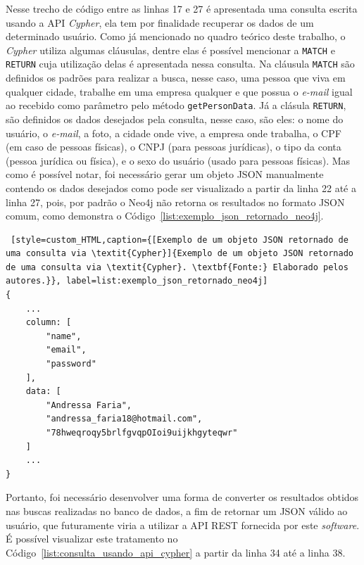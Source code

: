 
Nesse trecho de código entre as linhas 17 e 27 é apresentada uma consulta escrita usando a API \textit{Cypher}, ela tem por finalidade recuperar os dados de um determinado usuário. Como já mencionado no quadro teórico deste trabalho, o \textit{Cypher} utiliza algumas cláusulas, dentre elas é possível mencionar a \texttt{MATCH} e \texttt{RETURN} cuja utilização delas é apresentada nessa consulta. Na cláusula \texttt{MATCH} são definidos os padrões para realizar a busca, nesse caso, uma pessoa que viva em qualquer cidade, trabalhe em uma empresa qualquer e que possua o \textit{e-mail} igual ao recebido como parâmetro pelo método \texttt{getPersonData}. Já a clásula \texttt{RETURN}, são definidos os dados desejados pela consulta, nesse caso, são eles: o nome do usuário, o \textit{e-mail}, a foto, a cidade onde vive, a empresa onde trabalha, o CPF (em caso de pessoas físicas), o CNPJ (para pessoas jurídicas), o tipo da conta (pessoa jurídica ou física), e o sexo do usuário (usado para pessoas físicas). Mas como é possível notar, foi necessário gerar um objeto JSON manualmente contendo os dados desejados como pode ser visualizado a partir da linha 22 até a linha 27, pois, por padrão o Neo4j não retorna os resultados no formato JSON comum, como demonstra o Código~\ref{list:exemplo_json_retornado_neo4j}. 

\begin{lstlisting} [style=custom_HTML,caption={[Exemplo de um objeto JSON retornado de uma consulta via \textit{Cypher}]{Exemplo de um objeto JSON retornado de uma consulta via \textit{Cypher}. \textbf{Fonte:} Elaborado pelos autores.}}, label=list:exemplo_json_retornado_neo4j] 	
{
	...
	column: [
		"name",
		"email",
		"password"
	],
	data: [
		"Andressa Faria",
		"andressa_faria18@hotmail.com",
		"78hweqroqy5brlfgvqpOIoi9uijkhgyteqwr"
	]
	...
}
\end{lstlisting}

Portanto, foi necessário desenvolver uma forma de converter os resultados obtidos nas buscas realizadas no banco de dados, a fim de retornar um JSON válido ao usuário, que futuramente viria a utilizar a API REST fornecida por este \textit{software}. É possível visualizar este tratamento no Código~\ref{list:consulta_usando_api_cypher} a partir da linha 34 até a linha 38.

